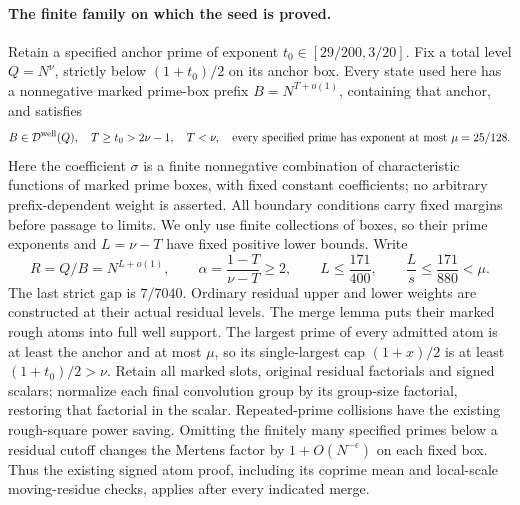 \documentclass[11pt]{article}
\begin{document}
\paragraph{The finite family on which the seed is proved.}
Retain a specified anchor prime of exponent
$t_0\in[29/200,3/20]$.  Fix a total level
$Q=N^\nu$, strictly below $(1+t_0)/2$ on its anchor box.
Every state used here has a nonnegative marked prime-box prefix
$B=N^{T+o(1)}$, containing that anchor, and satisfies
\begin{equation}\label{eq:second-seed-family}
 B\in\mathcal D^{\rm well}(Q),\quad
 T\ge t_0>2\nu-1,\quad T<\nu,\quad
 \text{every specified prime has exponent at most }\mu=25/128.
\end{equation}
Here the coefficient $\sigma$ is a finite nonnegative combination of
characteristic functions of marked prime boxes, with fixed constant
coefficients; no arbitrary prefix-dependent weight is asserted.
All boundary conditions carry fixed margins before passage to limits.
We only use finite collections of boxes, so their prime exponents
and $L=\nu-T$ have fixed positive lower bounds.  Write
\[
 R=Q/B=N^{L+o(1)},\qquad
 \alpha=\frac{1-T}{\nu-T}\ge2,\qquad
 L\le\frac{171}{400},\qquad
 \frac{L}{s}\le\frac{171}{880}<\mu.
\]
The last strict gap is $7/7040$.
Ordinary residual upper and lower weights are constructed at their
actual residual levels.  The merge lemma puts their marked rough
atoms into full well support.  The largest prime of every admitted
atom is at least the anchor and at most $\mu$, so its single-largest
cap $(1+x)/2$ is at least $(1+t_0)/2>\nu$.
Retain all marked slots, original residual factorials and signed
scalars; normalize each final convolution group by its group-size
factorial, restoring that factorial in the scalar.  Repeated-prime
collisions have the existing rough-square power saving.  Omitting
the finitely many specified primes below a residual cutoff changes
the Mertens factor by $1+O(N^{-\epsilon})$ on each fixed box.
Thus the existing signed atom proof, including its coprime mean and
local-scale moving-residue checks, applies after every indicated merge.
\end{document}
